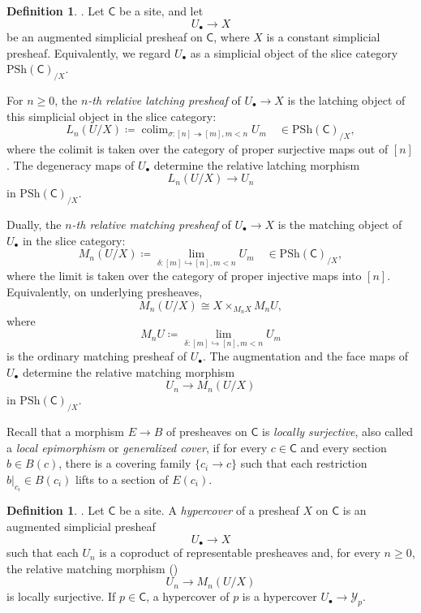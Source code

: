\documentclass{amsart}
\newcommand{\cat}[1]{\mathsf{#1}}
\DeclareMathOperator*{\colim}{colim}
\newcommand{\psh}{\mathrm{PSh}}
\newcommand{\Yo}{\mathscr{Y}}
\theoremstyle{definition}
\newtheorem{definition}[equation]{Definition}
\numberwithin{equation}{subsection}
\numberwithin{subsubsection}{subsection}
\begin{document}
\begin{definition}\label{def:matching.relative.matching}\label{def:latching.object}
  \textnormal{\cite[Definition~15.2.5 and Corollary~15.2.9]{Hir03}}.
  Let \(\cat{C}\) be a site, and let
  \[
    U_{\bullet}\longrightarrow X
  \]
  be an augmented simplicial presheaf on \(\cat{C}\), where \(X\) is a constant
  simplicial presheaf.
  Equivalently, we regard
  \(U_{\bullet}\) as a simplicial object of the slice category
  \(\psh(\cat{C})_{/X}\).

  For \(n\geq 0\), the \emph{\(n\)-th relative latching presheaf} of
  \(U_{\bullet}\to X\) is the latching object of this simplicial object in
  the slice category:
  \[
    L_n(U/X)\coloneqq
    \colim_{\sigma:[n]\twoheadrightarrow[m], m<n} U_m
    \quad\in\psh(\cat{C})_{/X},
  \]
  where the colimit is taken over the category of proper surjective maps
  out of \([n]\). The degeneracy maps of \(U_{\bullet}\) determine the relative
  latching
  morphism
  \[
    L_n(U/X)\longrightarrow U_n
  \]
  in \(\psh(\cat{C})_{/X}\).

  Dually, the \emph{\(n\)-th relative matching presheaf} of
  \(U_{\bullet}\to X\) is the matching object of \(U_{\bullet}\) in the
  slice category:
  \[
    M_n(U/X)\coloneqq
    \lim_{\delta:[m]\hookrightarrow[n], m<n} U_m
    \quad\in\psh(\cat{C})_{/X},
  \]
  where the limit is taken over the category of proper injective maps into
  \([n]\). Equivalently, on underlying presheaves,
  \[
    M_n(U/X)
    \cong
    X\times_{M_nX}M_nU,
  \]
  where
  \[
    M_nU\coloneqq
    \lim_{\delta:[m]\hookrightarrow[n], m<n} U_m
  \]
  is the ordinary matching presheaf of \(U_{\bullet}\). The augmentation and
  the face maps of \(U_{\bullet}\) determine the relative matching morphism
  \[
    U_n\longrightarrow M_n(U/X)
  \]
  in \(\psh(\cat{C})_{/X}\).
\end{definition}

Recall that a morphism \(E\to B\) of presheaves on \(\cat{C}\) is \emph{locally
surjective}, also
called a \emph{local epimorphism} or \emph{generalized cover}, if for
every \(c\in\cat{C}\) and every section \(b\in B(c)\), there is a covering
family \(\{c_i\to c\}\) such that each restriction
\(b|_{c_i}\in B(c_i)\) lifts to a section of \(E(c_i)\).

\begin{definition}\label{def:hypercover}
  \textnormal{\cite[Definition~4.2]{DHI04}}.
  Let \(\cat{C}\) be a site. A \emph{hypercover} of a presheaf \(X\) on
  \(\cat{C}\) is an augmented simplicial presheaf
  \[
    U_{\bullet}\longrightarrow X
  \]
  such that each \(U_n\) is a coproduct of representable presheaves and, for
  every \(n\geq 0\), the relative matching morphism
  ()
  \[
    U_n\longrightarrow M_n(U/X)
  \]
  is locally surjective. If \(p\in\cat{C}\), a hypercover of \(p\) is a
  hypercover
  \(U_{\bullet}\to\Yo_p\).
\end{definition}
\end{document}
